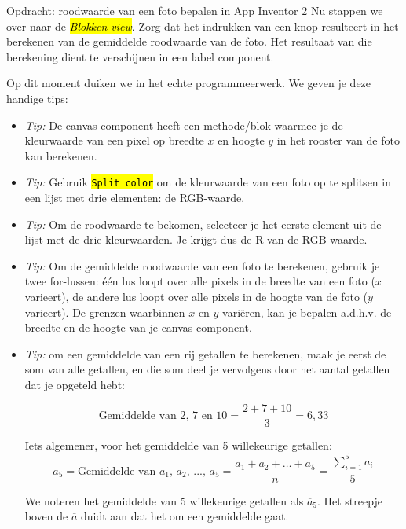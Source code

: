 \begin{opdracht}{Opdracht: roodwaarde van een foto bepalen in App Inventor 2}
		Nu stappen we over naar de \hl{\emph{Blokken view}}. Zorg dat het indrukken van een knop resulteert in het berekenen van de gemiddelde roodwaarde van de foto. Het resultaat van die berekening dient te verschijnen in een label component.
		
		Op dit moment duiken we in het echte programmeerwerk. We geven je deze handige tips:
		
		\begin{itemize}
			\item \emph{Tip:} De canvas component heeft een methode/blok waarmee je de kleurwaarde van een pixel op breedte $x$ en hoogte $y$ in het rooster van de foto kan berekenen. 
			
			\item \emph{Tip:} Gebruik \hl{\texttt{Split color}} om de kleurwaarde van een foto op te splitsen in een lijst met drie elementen: de RGB-waarde.
			
			\item \emph{Tip:} Om de roodwaarde te bekomen, selecteer je het eerste element uit de lijst met de drie kleurwaarden. Je krijgt dus de R van de RGB-waarde.
			
			\item \emph{Tip:} Om de gemiddelde roodwaarde van een foto te berekenen, gebruik je twee for-lussen: \'e\'en lus loopt over alle pixels in de breedte van een foto ($x$ varieert), de andere lus loopt over alle pixels in de hoogte van de foto ($y$ varieert). De grenzen waarbinnen $x$ en $y$ vari\"eren, kan je bepalen a.d.h.v. de breedte en de hoogte van je canvas component.
			
			\item \emph{Tip:} om een gemiddelde van een rij getallen te berekenen, maak je eerst de som van alle getallen, en die som deel je vervolgens door het aantal getallen dat je opgeteld hebt:
			
			\begin{equation*}
			\text{Gemiddelde van 2, 7 en 10} = \frac{2+7+10}{3} = 6,33
			\end{equation*}
			
			Iets algemener, voor het gemiddelde van 5 willekeurige getallen:
			\begin{equation*}
			\overline{a_5} = \text{Gemiddelde van $a_1$, $a_2$, ..., $a_5$} = \frac{a_1+a_2+\ldots+a_5}{n} = \frac{\sum_{i=1}^{5} a_i}{5}
			\end{equation*}
			
			We  noteren het gemiddelde van 5 willekeurige getallen als $\overline{a}_5$. Het streepje boven de $\overline{a}$ duidt aan dat het om een gemiddelde gaat.
			

\end{itemize}
\end{opdracht}

